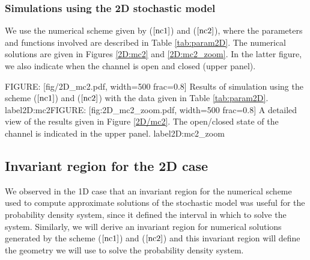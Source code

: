 \subsubsection{Simulations using the 2D stochastic model}


We use the numerical scheme given by ($\ref{nc1}$) and ($\ref{nc2}$), where the parameters and functions involved are described in Table \ref{tab:param2D}. The numerical solutions are given in Figures \ref{2D:mc2} and \ref{2D:mc2_zoom}. In the latter figure, we also indicate when the channel is open and closed (upper panel).

FIGURE: [fig/2D_mc2.pdf, width=500 frac=0.8] Results of simulation using the scheme ($\ref{nc1}$) and ($\ref{nc2}$) with the data given in Table \ref{tab:param2D}. label{2D:mc2}FIGURE: [fig:2D_mc2_zoom.pdf, width=500 frac=0.8] A detailed view of the results given in Figure \ref{2D/mc2}. The open/closed state of the channel is indicated in the upper panel. label{2D:mc2_zoom}%


\subsection{Invariant region for the 2D case}
\label{invariant2D}

We observed in the 1D case that an invariant region for the numerical scheme used to compute approximate solutions of the stochastic model was useful for the probability density system, since it defined the interval in which to solve the system. Similarly, we will derive an invariant region for numerical solutions generated by the scheme  ($\ref{nc1}$) and ($\ref{nc2}$) and this invariant region will define the geometry we will use to solve the probability density system.

